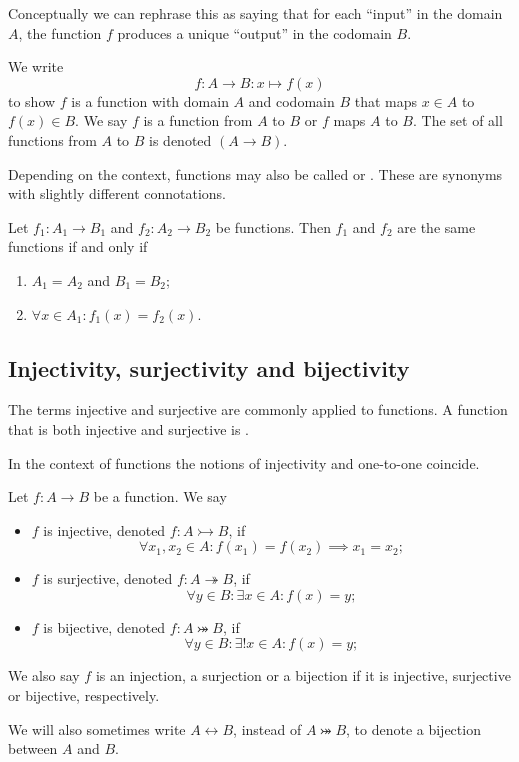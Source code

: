 Conceptually we can rephrase this as saying that for each ``input'' in the domain $A$, the function $f$ produces a unique ``output'' in the codomain $B$.

\begin{note}
We write
\[f:A \to B: x\mapsto f(x) \]
to show $f$ is a function with domain $A$ and codomain $B$ that maps $x\in A$ to $f(x)\in B$. We say $f$ is a function from $A$ to $B$ or $f$ maps $A$ to $B$. The set of all functions from $A$ to $B$ is denoted $(A\to B)$.
\end{note}

Depending on the context, functions may also be called  or . These are synonyms with slightly different connotations.

\begin{lemma}
Let $f_1: A_1\to B_1$ and $f_2: A_2\to B_2$ be functions. Then $f_1$ and $f_2$ are the same functions \textup{if and only if}
\begin{enumerate}
\item $A_1 = A_2$ and $B_1 = B_2$;
\item $\forall x\in A_1: f_1(x) = f_2(x)$.
\end{enumerate}
\end{lemma}

\subsection{Injectivity, surjectivity and bijectivity}
\begin{definition}
The terms injective and surjective are commonly applied to functions. A function that is both injective and surjective is .
\end{definition}
In the context of functions the notions of injectivity and one-to-one coincide.
\begin{lemma}
Let $f:A\to B$ be a function. We say
\begin{itemize}
\item $f$ is injective, denoted $f: A\rightarrowtail B$, if
\[ \forall x_1,x_2\in A: f(x_1) = f(x_2) \implies x_1 = x_2; \]
\item $f$ is surjective, denoted $f: A\twoheadrightarrow B$, if
\[ \forall y\in B: \exists x\in A: f(x) = y; \]
\item $f$ is bijective, denoted $f: A\twoheadrightarrowtail B$, if
\[ \forall y\in B: \exists! x\in A: f(x) = y; \]
\end{itemize}
We also say $f$ is an injection, a surjection or a bijection if it is injective, surjective or bijective, respectively.

We will also sometimes write $A \leftrightarrow B$, instead of $A\twoheadrightarrowtail B$, to denote a bijection between $A$ and $B$.
\end{lemma}

